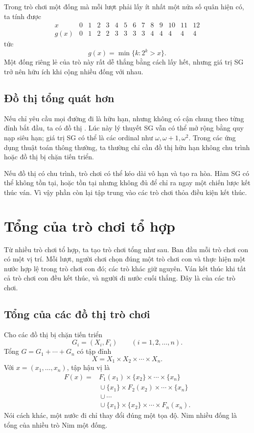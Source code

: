 \documentclass[11pt]{article}
\begin{document}
Trong trò chơi một đống mà mỗi lượt phải lấy ít nhất một nửa số quân hiện có,
ta tính được
\[
\begin{array}{c|ccccccccccccc}
x&0&1&2&3&4&5&6&7&8&9&10&11&12\\ \hline
g(x)&0&1&2&2&3&3&3&3&4&4&4&4&4
\end{array}
\]
tức
\[
  g(x)=\min\{k:2^k>x\}.
\]
Một đống riêng lẻ của trò này rất dễ thắng bằng cách lấy hết, nhưng giá trị SG
trở nên hữu ích khi cộng nhiều đống với nhau.

\subsection{Đồ thị tổng quát hơn}

Nếu chỉ yêu cầu mọi đường đi là hữu hạn, nhưng không có cận chung theo từng
đỉnh bắt đầu, ta có đồ thị . Lúc này lý thuyết SG vẫn
có thể mở rộng bằng quy nạp siêu hạn; giá trị SG có thể là các ordinal như
\(\omega,\omega+1,\omega^2\). Trong các ứng dụng thuật toán thông thường, ta
thường chỉ cần đồ thị hữu hạn không chu trình hoặc đồ thị bị chặn tiến triển.

Nếu đồ thị có chu trình, trò chơi có thể kéo dài vô hạn và tạo ra hòa. Hàm SG
có thể không tồn tại, hoặc tồn tại nhưng không đủ để chỉ ra ngay một chiến
lược kết thúc ván. Vì vậy phần còn lại tập trung vào các trò chơi thỏa điều
kiện kết thúc.

\section{Tổng của trò chơi tổ hợp}

Từ nhiều trò chơi tổ hợp, ta tạo trò chơi tổng như sau. Ban đầu mỗi trò chơi
con có một vị trí. Mỗi lượt, người chơi chọn đúng một trò chơi con và thực hiện
một nước hợp lệ trong trò chơi con đó; các trò khác giữ nguyên. Ván kết thúc
khi tất cả trò chơi con đều kết thúc, và người đi nước cuối thắng. Đây là
 của các trò chơi.

\subsection{Tổng của các đồ thị trò chơi}

Cho các đồ thị bị chặn tiến triển
\[
  G_i=(X_i,F_i)\qquad(i=1,2,\ldots,n).
\]
Tổng \(G=G_1+\cdots+G_n\) có tập đỉnh
\[
  X=X_1\times X_2\times\cdots\times X_n.
\]
Với \(x=(x_1,\ldots,x_n)\), tập hậu vị là
\[
\begin{aligned}
F(x)={}&F_1(x_1)\times\{x_2\}\times\cdots\times\{x_n\}\\
&{}\cup\{x_1\}\times F_2(x_2)\times\cdots\times\{x_n\}\\
&{}\cup\cdots\\
&{}\cup\{x_1\}\times\{x_2\}\times\cdots\times F_n(x_n).
\end{aligned}
\]
Nói cách khác, một nước đi chỉ thay đổi đúng một tọa độ. Nim nhiều đống là tổng
của nhiều trò Nim một đống.
\end{document}
